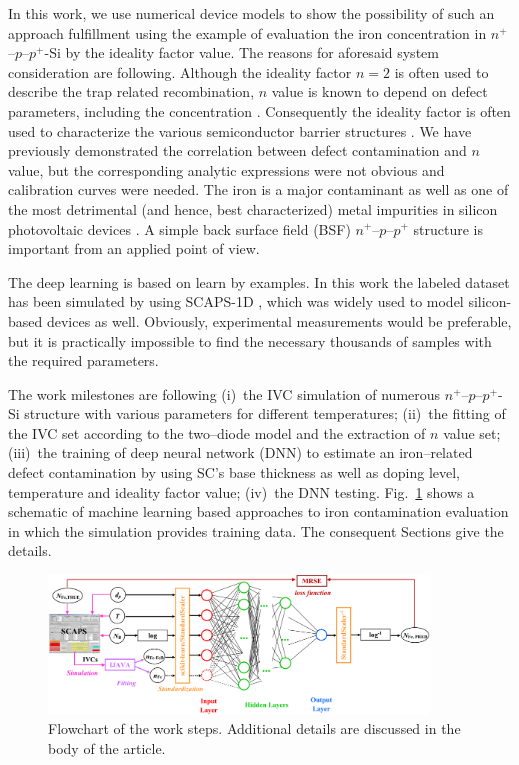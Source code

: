 \documentclass[journal]{IEEEtran}
\begin{document}
In this work, we use numerical device models to show the possibility of such an approach fulfillment using the example of evaluation the iron concentration in $n^+$--$p$--$p^+$-Si by the ideality factor value.
The reasons for aforesaid system consideration are following.
Although the ideality factor $n=2$ is often used to describe the trap related recombination, $n$ value is known to depend on defect parameters, including the concentration \cite{n2_Beier,n2McIntosh,n2Kaminski,HAMEIRI2013251,Heide}.
Consequently the ideality factor is often used to characterize the various
semiconductor barrier structures \cite{Heide,Duan,n_CharGaN,n_CharSemic,n_CharPhysRevAppl,BulyarJAP}.
We have previously demonstrated \cite{Olikh2019SM} the correlation between defect contamination and $n$ value, but the corresponding analytic expressions were not obvious and calibration curves were needed.
The iron is a major contaminant as well as one of the most detrimental (and hence, best
characterized)
metal impurities in silicon photovoltaic devices \cite{HowMuchPhysics,FeB:Schmidt}.
A simple back surface field (BSF) $n^+$--$p$--$p^+$ structure is important from an applied point of view.


The deep learning is based on learn by examples.
In this work the labeled dataset has been simulated by using SCAPS-1D \cite{SCAPS1,SCAPS2}, which was widely used to model silicon-based devices \cite{SCAPSuseSi4,SCAPSuseSi1,SCAPSuseSi6} as well.
Obviously, experimental measurements would be preferable, but it is practically impossible to find the necessary thousands of samples with the required parameters.

The work milestones are following
(i)~the IVC simulation of numerous $n^+$--$p$--$p^+$-Si structure with various parameters for different temperatures;
(ii)~the fitting of the IVC set according to the two--diode model and the extraction of $n$ value set;
(iii)~the training of deep neural network (DNN) to estimate an iron--related defect contamination  by using SC's base thickness as well as doping level,
temperature and ideality factor value;
(iv)~the DNN testing.
Fig.~\ref{fig_chem} shows a schematic of machine learning based approaches to iron contamination evaluation in which the simulation provides training data.
The consequent Sections give the details.

\begin{figure}[tb]
\centering
\includegraphics[width=0.9\textwidth]{Chem}
\caption{Flowchart of the work  steps.
Additional details are discussed in the body of the article.}
\label{fig_chem}
\end{figure}
\end{document}

